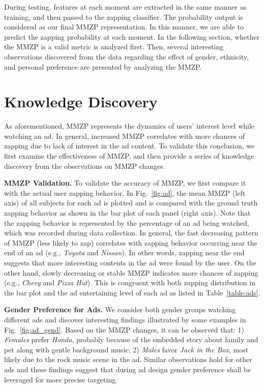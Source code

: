 \documentclass[twoside,leqno,twocolumn]{article}
\begin{document}
During testing, features at each moment are extracted in the same manner as training, and then passed to the zapping classifier. The probability output is considered as our final MMZP representation. In this manner, we are able to predict the zapping probability at each moment. In the following section, whether the MMZP is a valid metric is analyzed first. Then, several interesting observations discovered from the data regarding the effect of gender, ethnicity, and personal preference are presented by analyzing the MMZP.


\section{Knowledge Discovery}

As aforementioned, MMZP represents the dynamics of users' interest level while watching an ad. In general, increased MMZP correlates with more chances of zapping due to lack of interest in the ad content. To validate this conclusion, we first examine the effectiveness of MMZP, and then provide a series of knowledge discovery from the observations on MMZP changes. 



\noindent \textbf{MMZP Validation.} To validate the accuracy of MMZP, we first compare it with the actual user zapping behavior. In Fig.~\ref{fig:ad}, the mean MMZP (left axis) of all subjects for each ad is plotted and is compared with the ground truth zapping behavior as shown in the bar plot of each panel (right axis). Note that the zapping behavior is represented by the percentage of an ad being watched, which was recorded during data collection. In general, the fast decreasing pattern of MMZP (less likely to zap) correlates with zapping behavior occurring near the end of an ad (e.g., \textit{Toyota} and \textit{Nissan}). In other words, zapping near the end suggests that more interesting contents in the ad were found by the user. On the other hand, slowly decreasing or stable MMZP indicates more chances of zapping (e.g., \textit{Chevy} and \textit{Pizza Hut}). This is congruent with both zapping distribution in the bar plot and the ad entertaining level of each ad as listed in Table~\ref{table:ads}. 

\noindent \textbf{Gender Preference for Ads.} We consider both gender groups watching different ads and discover interesting findings illustrated by some examples in Fig.~\ref{fig:ad_gend}. Based on the MMZP changes, it can be observed that: 1) \textit{Females} prefer \textit{Honda}, probably because of the embedded story about family and pet along with gentle background music; 2) \textit{Males} favor \textit{Jack in the Box}, most likely due to the rock music scene in the ad. Similar observations hold for other ads and these findings suggest that during ad design gender preference shall be leveraged for more precise targeting. 
\end{document}
